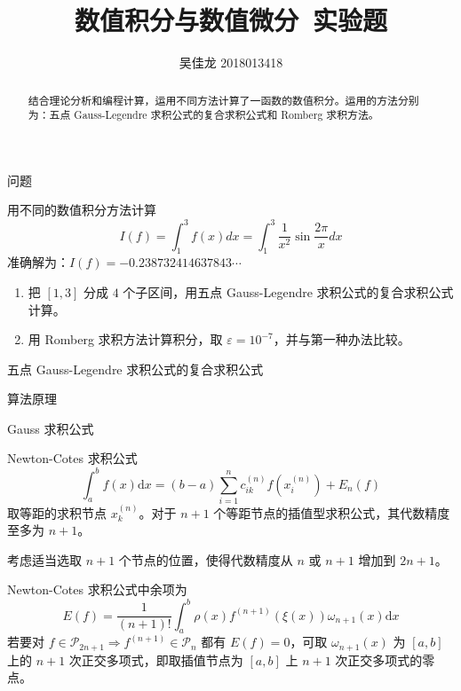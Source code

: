 \documentclass[a4paper]{article}
\providecommand{\keywords}[1]{\textbf{\textit{关键词}} #1}
\begin{document}
 
\title{数值积分与数值微分\ 实验题}
\author{吴佳龙 2018013418}
\date{}
\maketitle

\begin{abstract}
	结合理论分析和编程计算，运用不同方法计算了一函数的数值积分。运用的方法分别为：五点 Gauss-Legendre 求积公式的复合求积公式和 Romberg 求积方法。
\end{abstract}


\begin{multicols}{2}

\begin{section}{问题}

	用不同的数值积分方法计算 $$I(f)=\int_{1}^{3} f(x) d x=\int_{1}^{3} \frac{1}{x^{2}} \sin \frac{2 \pi}{x} d x$$ 准确解为：$I(f)=-0.238732414637843 \cdots$
	
	\begin{enumerate}
  		\item 把 $[1,3]$ 分成 $4$ 个子区间，用五点 Gauss-Legendre 求积公式的复合求积公式计算。
  		\item 用 Romberg 求积方法计算积分，取 $\varepsilon = 10^{-7}$，并与第一种办法比较。
	\end{enumerate}	

\end{section}

\begin{section}{五点 Gauss-Legendre 求积公式的复合求积公式}
	
	\begin{subsection}{算法原理}
		
		\begin{subsubsection}{Gauss 求积公式}
		
			Newton-Cotes 求积公式 $$\int_{a}^{b} f(x) \mathrm{d} x=(b-a) \sum_{i=1}^{n} c_{i k}^{(n)} f\left(x_{i}^{(n)}\right)+E_{n}(f)$$ 取等距的求积节点 $x_k^{(n)}$。对于 $n+1$ 个等距节点的插值型求积公式，其代数精度至多为 $n+1$。
			
			考虑适当选取 $n+1$ 个节点的位置，使得代数精度从 $n $ 或 $n+1$ 增加到 $2n+1$。
			
			Newton-Cotes 求积公式中余项为 $$E(f)=\frac{1}{(n+1) !} \int_{a}^{b} \rho(x) f^{(n+1)}(\xi(x)) \omega_{n+1}(x) \mathrm{d} x$$ 若要对 $f \in \mathscr{P}_{2 n+1}\Rightarrow f^{(n+1)} \in \mathscr{P}_{n}$ 都有 $E(f)=0$，可取 $\omega_{n+1}(x)$ 为 $[a,b]$ 上的 $n+1$ 次正交多项式，即取插值节点为 $[a,b]$ 上 $n+1$ 次正交多项式的零点。
			

\end{subsubsection}
\end{subsection}
\end{section}
\end{multicols}
\end{document}
